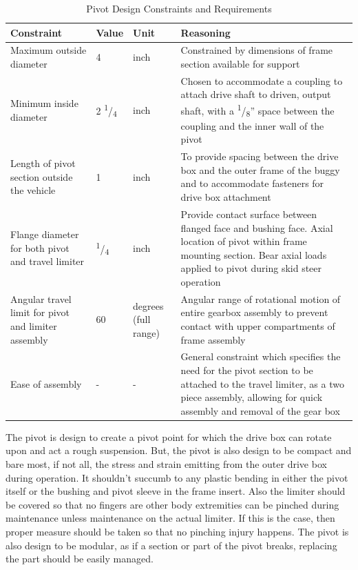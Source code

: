 \begin{table}[htbp]
 \centering
 \caption{Pivot Design Constraints and Requirements}
 \begin{tabular}{| p{4cm}llp{6cm} |} \hline
 Constraint & Value & Unit & Reasoning \\ \hline
 Maximum outside diameter & 4 & inch & Constrained by dimensions of frame section available for support \\
 Minimum inside diameter & 2 \textsuperscript{1}/\textsubscript{4} & inch & Chosen to accommodate a coupling to attach drive shaft to driven, output shaft, with a \textsuperscript{1}/\textsubscript{8}'' space between the coupling and the inner wall of the pivot \\
 Length of pivot section outside the vehicle & 1 & inch & To provide spacing between the drive box and the outer frame of the buggy and to accommodate fasteners for drive box attachment \\
 Flange diameter for both pivot and travel limiter & \textsuperscript{1}/\textsubscript{4} & inch & Provide contact surface between flanged face and bushing face. Axial location of pivot within frame mounting section. Bear axial loads applied to pivot during skid steer operation \\
 Angular travel limit for pivot and limiter assembly & 60 & degrees (full range) & Angular range of rotational motion of entire gearbox assembly to prevent contact with upper compartments of frame assembly \\
 Ease of assembly & - & - & General constraint which specifies the need for the pivot section to be attached to the travel limiter, as a two piece assembly, allowing for quick assembly and removal of the gear box \\ \hline
 \end{tabular}
 \label{tab:pivot_const}
 \end{table}
\newpage
The pivot is design to create a pivot point for which the drive box can rotate upon and act a rough suspension. But, the pivot is also design to be compact and bare most, if not all, the stress and strain emitting from the outer drive box during operation. It shouldn't succumb to any plastic bending in either the pivot itself or the bushing and pivot sleeve in the frame insert. Also the limiter should be covered so that no fingers are other body extremities can be pinched during maintenance unless maintenance on the actual limiter. If this is the case, then proper measure should be taken so that no pinching injury happens. The pivot is also design to be modular, as if a section or part of the pivot breaks, replacing the part should be easily managed. 

